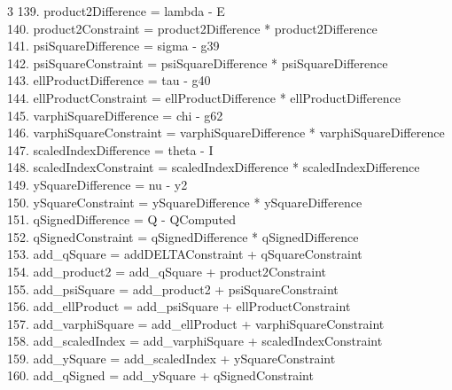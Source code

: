 \documentclass[10pt]{article}
\begin{document}
\begin{multicols}{3}
139. product2Difference = lambda - E\\
140. product2Constraint = product2Difference * product2Difference\\
141. psiSquareDifference = sigma - g39\\
142. psiSquareConstraint = psiSquareDifference * psiSquareDifference\\
143. ellProductDifference = tau - g40\\
144. ellProductConstraint = ellProductDifference * ellProductDifference\\
145. varphiSquareDifference = chi - g62\\
146. varphiSquareConstraint = varphiSquareDifference * varphiSquareDifference\\
147. scaledIndexDifference = theta - I\\
148. scaledIndexConstraint = scaledIndexDifference * scaledIndexDifference\\
149. ySquareDifference = nu - y2\\
150. ySquareConstraint = ySquareDifference * ySquareDifference\\
151. qSignedDifference = Q - QComputed\\
152. qSignedConstraint = qSignedDifference * qSignedDifference\\
153. add\_qSquare = addDELTAConstraint + qSquareConstraint\\
154. add\_product2 = add\_qSquare + product2Constraint\\
155. add\_psiSquare = add\_product2 + psiSquareConstraint\\
156. add\_ellProduct = add\_psiSquare + ellProductConstraint\\
157. add\_varphiSquare = add\_ellProduct + varphiSquareConstraint\\
158. add\_scaledIndex = add\_varphiSquare + scaledIndexConstraint\\
159. add\_ySquare = add\_scaledIndex + ySquareConstraint\\
160. add\_qSigned = add\_ySquare + qSignedConstraint\\
\end{multicols}
\end{document}
